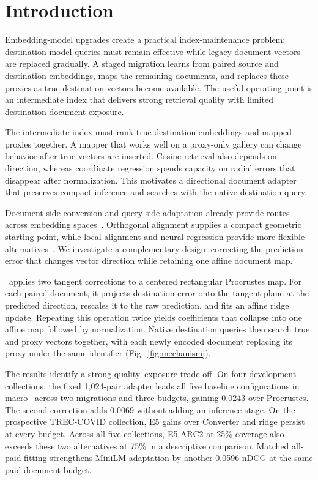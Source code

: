 \section{Introduction}
\label{sec:introduction}
Embedding-model upgrades create a practical index-maintenance problem: destination-model queries must remain effective while legacy document vectors are replaced gradually. A staged migration learns from paired source and destination embeddings, maps the remaining documents, and replaces these proxies as true destination vectors become available. The useful operating point is an intermediate index that delivers strong retrieval quality with limited destination-document exposure.

The intermediate index must rank true destination embeddings and mapped proxies together. A mapper that works well on a proxy-only gallery can change behavior after true vectors are inserted. Cosine retrieval also depends on direction, whereas coordinate regression spends capacity on radial errors that disappear after normalization. This motivates a directional document adapter that preserves compact inference and searches with the native destination query.

Document-side conversion and query-side adaptation already provide routes across embedding spaces~\cite{embeddingconverter,driftadapter}. Orthogonal alignment supplies a compact geometric starting point, while local alignment and neural regression provide more flexible alternatives~\cite{la2m,simplelinear}. We investigate a complementary design: correcting the prediction error that changes vector direction while retaining one affine document map.

\method\ applies two tangent corrections to a centered rectangular Procrustes map. For each paired document, it projects destination error onto the tangent plane at the predicted direction, rescales it to the raw prediction, and fits an affine ridge update. Repeating this operation twice yields coefficients that collapse into one affine map followed by normalization. Native destination queries then search true and proxy vectors together, with each newly encoded document replacing its proxy under the same identifier (Fig.~\ref{fig:mechanism}).

The results identify a strong quality--exposure trade-off. On four development collections, the fixed 1,024-pair adapter leads all five baseline configurations in macro \ndcg\ across two migrations and three budgets, gaining 0.0243 over Procrustes. The second correction adds 0.0069 without adding an inference stage. On the prospective TREC-COVID collection, E5 gains over Converter and ridge persist at every budget. Across all five collections, E5 ARC2 at 25\% coverage also exceeds these two alternatives at 75\% in a descriptive comparison. Matched all-paid fitting strengthens MiniLM adaptation by another 0.0596 nDCG at the same paid-document budget.

